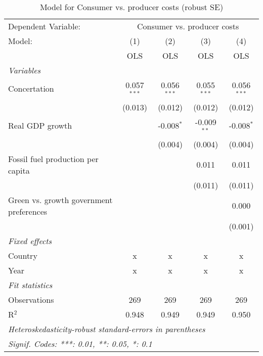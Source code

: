 
\begin{table}[htbp]
   \caption{Model for Consumer vs. producer costs (robust SE)}
   \centering
   \begin{tabular}{lcccc}
      \toprule
      Dependent Variable: & \multicolumn{4}{c}{Consumer vs. producer costs}\\
      Model:                                  & (1)           & (2)           & (3)           & (4)\\  
                                              &  OLS          & OLS           & OLS           & OLS\\  
      \midrule
      \emph{Variables}\\
      Concertation                            & 0.057$^{***}$ & 0.056$^{***}$ & 0.055$^{***}$ & 0.056$^{***}$\\   
                                              & (0.013)       & (0.012)       & (0.012)       & (0.012)\\   
      Real GDP growth                         &               & -0.008$^{*}$  & -0.009$^{**}$ & -0.008$^{*}$\\   
                                              &               & (0.004)       & (0.004)       & (0.004)\\   
      Fossil fuel production per capita       &               &               & 0.011         & 0.011\\   
                                              &               &               & (0.011)       & (0.011)\\   
      Green vs. growth government preferences &               &               &               & 0.000\\   
                                              &               &               &               & (0.001)\\   
      \emph{Fixed effects}\\
      Country                                 & x             & x             & x             & x\\  
      Year                                    & x             & x             & x             & x\\  
      \midrule \emph{Fit statistics}\\
      Observations                            & 269           & 269           & 269           & 269\\  
      R$^2$                                   & 0.948         & 0.949         & 0.949         & 0.950\\  
      \midrule
      \multicolumn{5}{l}{\emph{Heteroskedasticity-robust standard-errors in parentheses}}\\
      \multicolumn{5}{l}{\emph{Signif. Codes: ***: 0.01, **: 0.05, *: 0.1}}\\
   \end{tabular}
\end{table}


